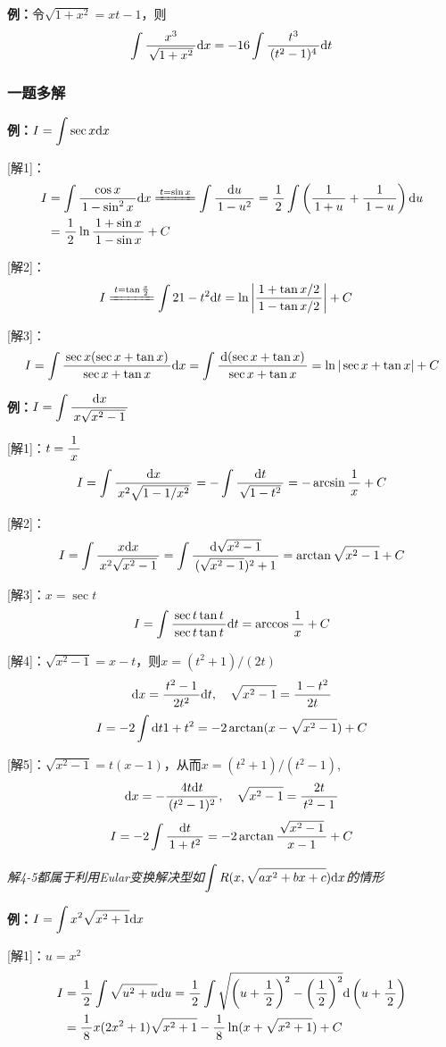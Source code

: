 {\bf 例：}令$\sqrt{1+x^2}=xt-1$，则
$$\dint\df{x^3}{\sqrt{1+x^2}}\d x=-16\dint\df{t^3}{(t^2-1)^4}\d t$$

\subsubsection{一题多解}

{\bf 例：}$I=\dint\sec x\d x$

[解1]：
\begin{align}
	I&=\dint\df{\cos x}{1-\sin^2x}\d x
	\xlongequal{t=\sin x}\dint\df{\d u}{1-u^2}
	=\df12\dint\left(\df1{1+u}+\df1{1-u}\right)\d u\notag\\
	&=\df12\ln\df{1+\sin x}{1-\sin x}+C\notag
\end{align}

[解2]：
\begin{align}
	I&\xlongequal{t=\tan\frac x2}\dint2{1-t^2}\d t
	=\ln\left|\df{1+\tan x/2}{1-\tan x/2}\right|+C\notag
\end{align}

[解3]：
$$
I=\dint\df{\sec x(\sec x+\tan x)}{\sec x+\tan x}\d x
=\dint\df{\d(\sec x+\tan x)}{\sec x+\tan x}=\ln|\sec x+\tan x|+C
$$

{\bf 例：}$I=\dint\df{\d x}{x\sqrt{x^2-1}}$

[解1]：$t=\df1x$
$$I=\dint\df{\d x}{x^2\sqrt{1-1/x^2}}=-\dint\df{\d t}{\sqrt{1-t^2}}
=-\arcsin\df1x+C$$

[解2]：
$$I=\dint\df{x\d x}{x^2\sqrt{x^2-1}}=\dint\df{\d\sqrt{x^2-1}}
{(\sqrt{x^2-1})^2+1}=\arctan\sqrt{x^2-1}+C$$

[解3]：$x=\sec t$
$$I=\dint\df{\sec t\tan t}{\sec t\tan t}\d t=\arccos\df1x+C$$

[解4]：$\sqrt{x^2-1}=x-t$，则$x=(t^2+1)/(2t)$
$$\d x=\df{t^2-1}{2t^2}\d t,\quad \sqrt{x^2-1}=\df{1-t^2}{2t}$$
$$I=-2\dint{\d t}{1+t^2}=-2\arctan(x-\sqrt{x^2-1})+C$$

[解5]：$\sqrt{x^2-1}=t(x-1)$，从而$x=(t^2+1)/(t^2-1)$,
$$\d x=-\df{4t\d t}{(t^2-1)^2},\quad \sqrt{x^2-1}=\df{2t}{t^2-1}$$
$$I=-2\dint\df{\d t}{1+t^2}=-2\arctan\df{\sqrt{x^2-1}}{x-1}+C$$

{\it 解4-5都属于利用Eular变换解决型如$\dint R(x,\sqrt{ax^2+bx+c})\d x$的情形}

{\bf 例：}$I=\dint x^2\sqrt{x^2+1}\d x$

[解1]：$u=x^2$
\begin{align}
I&=\df12\dint\sqrt{u^2+u}\d u=\df12\dint\sqrt{\left(u+\df12\right)^2
-\left(\df12\right)^2}\d\left(u+\df12\right)\notag\\
&=\df18x(2x^2+1)\sqrt{x^2+1}-\df18\ln(x+\sqrt{x^2+1})+C\notag
\end{align}

